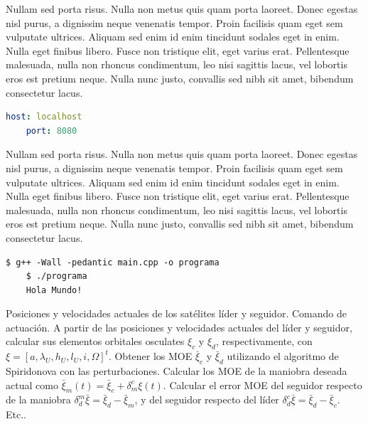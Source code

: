 Nullam sed porta risus. Nulla non metus quis quam porta laoreet. Donec egestas nisl purus, a dignissim neque venenatis tempor. Proin facilisis quam eget sem vulputate ultrices. Aliquam sed enim id enim tincidunt sodales eget in enim. Nulla eget finibus libero. Fusce non tristique elit, eget varius erat. Pellentesque malesuada, nulla non rhoncus condimentum, leo nisi sagittis lacus, vel lobortis eros est pretium neque. Nulla nunc justo, convallis sed nibh sit amet, bibendum consectetur lacus.

\begin{lstlisting}[language=yaml, caption={Snippet: Configuración YAML}]
	host: localhost
	port: 8080
\end{lstlisting}

Nullam sed porta risus. Nulla non metus quis quam porta laoreet. Donec egestas nisl purus, a dignissim neque venenatis tempor. Proin facilisis quam eget sem vulputate ultrices. Aliquam sed enim id enim tincidunt sodales eget in enim. Nulla eget finibus libero. Fusce non tristique elit, eget varius erat. Pellentesque malesuada, nulla non rhoncus condimentum, leo nisi sagittis lacus, vel lobortis eros est pretium neque. Nulla nunc justo, convallis sed nibh sit amet, bibendum consectetur lacus.

\begin{lstlisting}[style=terminal, caption={Vista desde una terminal Linux.}]
	$ g++ -Wall -pedantic main.cpp -o programa
	$ ./programa
	Hola Mundo!
\end{lstlisting}


\begin{algorithm}[t]
	\caption{Pseudocódigo del algoritmo AROM.}\label{alg_AROM}
	\begin{algorithmic}[1]
		\Require Posiciones y velocidades actuales de los satélites líder y seguidor.
		\Ensure  Comando de actuación.
		\Statex
		\Statex
		\State A partir de las posiciones y velocidades actuales del líder y seguidor, calcular sus elementos orbitales osculates $\xi_c$ y $\xi_d$, respectivamente, con $\xi = \left[a,\lambda_U,h_U,l_U,i,\Omega\right]^t$.
		\Statex
		\State Obtener los MOE $\bar{\xi}_c$ y $\bar{\xi}_d$ utilizando el algoritmo de Spiridonova con las perturbaciones.
		\Statex
		\State Calcular los MOE de la maniobra deseada actual como $\bar{\xi}_m(t) = \bar{\xi}_c + \delta_m^c\xi(t)$.
		\Statex
		\State Calcular el error MOE del seguidor respecto de la maniobra $\delta_d^m \bar{\xi} = \bar{\xi}_d - \bar{\xi}_m$, y del seguidor respecto del líder $\delta_d^c \bar{\xi} = \bar{\xi}_d - \bar{\xi}_c$.
		\Statex
		\State Etc..
		\Statex
		\EndProcedure
	\end{algorithmic}
\end{algorithm}

